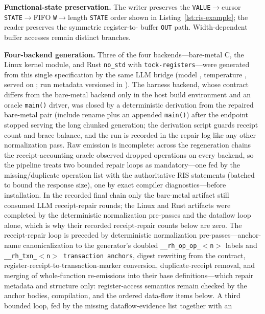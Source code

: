 \textbf{Functional-state preservation.} The writer preserves the
\texttt{VALUE}$\rightarrow$cursor \texttt{STATE}$\rightarrow$FIFO
\texttt{W}$\rightarrow$length \texttt{STATE} order shown in
Listing~\ref{lst:ris-example}; the reader preserves the symmetric register-to-
buffer \texttt{OUT} path. Width-dependent buffer accesses remain distinct
branches.

\textbf{Four-backend generation.} Three of the four backends---bare-metal C,
the Linux kernel module, and Rust \texttt{no\_std} with
\texttt{tock-registers}---were generated from this single \rislang{}
specification by the same LLM bridge
(model \LlmModelId{}, temperature \LlmTemperature{}, served on
\LlmEndpointHost{}; run metadata versioned in
). The harness
backend, whose contract differs from the bare-metal backend only in the
host build environment and an oracle \texttt{main()} driver, was closed by
a deterministic derivation from the repaired bare-metal pair (include
rename plus an appended \texttt{main()}) after the endpoint stopped
serving the long chunked generation; the derivation script guards receipt
count and brace balance, and the run is recorded in the repair log like
any other normalization pass. Raw emission is
incomplete: across the regeneration chains the receipt-accounting oracle
observed dropped operations on every backend, so the pipeline treats two
bounded repair loops as mandatory---one fed
by the missing/duplicate operation list with the authoritative RIS
statements (batched to bound the response size), one by exact compiler
diagnostics---before installation. In the recorded final chain only the
bare-metal artifact still consumed LLM receipt-repair rounds; the Linux
and Rust artifacts were completed by the deterministic normalization
pre-passes and the dataflow loop alone, which is why their recorded
receipt-repair counts below are zero. The receipt-repair loop is preceded by
deterministic normalization pre-passes---anchor-name canonicalization to
the generator's doubled \texttt{\_\_rh\_op\_op\_\ensuremath{<}n\ensuremath{>}}
labels and \texttt{\_\_rh\_txn\_\ensuremath{<}n\ensuremath{>} transaction anchors},
digest
rewriting from the contract, register-receipt-to-transaction-marker
conversion, duplicate-receipt removal, and merging of whole-function
re-emissions into their base definitions---which repair metadata and
structure only: register-access semantics remain checked by the anchor
bodies, compilation, and the ordered data-flow items below. A third bounded
loop, fed by the missing dataflow-evidence list together with an
